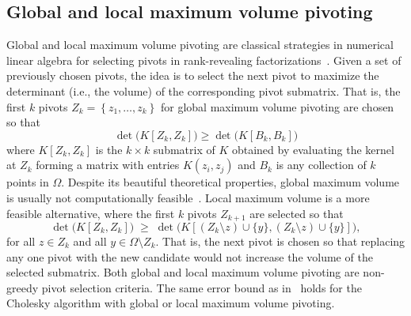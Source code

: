 \documentclass{amsart}
\theoremstyle{definition}
\theoremstyle{remark}
\begin{document}
\subsection{Global and local maximum volume pivoting}\label{sec:LocalMaxVol}

Global and local maximum volume pivoting are classical strategies in numerical linear algebra for selecting pivots in rank-revealing factorizations~\cite{damle2024reveal,gu1996efficient}. Given a set of previously chosen pivots, the idea is to select the next pivot to maximize the determinant (i.e., the volume) of the corresponding pivot submatrix. That is, the first $k$ pivots $Z_{k} = \left\{z_1,\ldots,z_k\right\}$ for global maximum volume pivoting are chosen so that
   \[
    \det\bigl(K[Z_k,Z_k]\bigr) \geq \det\bigl(K[B_k,B_k]\bigr)
    \]
    where $K[Z_k,Z_k]$ is the $k\times k$ submatrix of $K$ obtained by evaluating the kernel at $Z_k$ forming a matrix with entries $K(z_i,z_j)$ and $B_k$ is any collection of $k$ points in $\Omega$. Despite its beautiful theoretical properties, global maximum volume is usually not computationally feasible~\cite{civril2009selecting}. Local maximum volume is a more feasible alternative, where the first $k$ pivots $Z_{k+1}$ are selected so that 
    \[
    \det\bigl(K[Z_{k},Z_{k}]\bigr) \;\geq\; \det\bigl(K[\left(Z_{k}\setminus z\right)\cup\{y\},\left(Z_{k}\setminus z\right)\cup\{y\}]\bigr),
    \]
    for all $z\in Z_{k}$ and all $y\in \Omega \setminus Z_k$. That is, the next pivot is chosen so that replacing any one pivot with the new candidate would not increase the volume of the selected submatrix. Both global and local maximum volume pivoting are non-greedy pivot selection criteria. The same error bound as in~ holds for the Cholesky algorithm with global or local maximum volume pivoting. 
\end{document}
